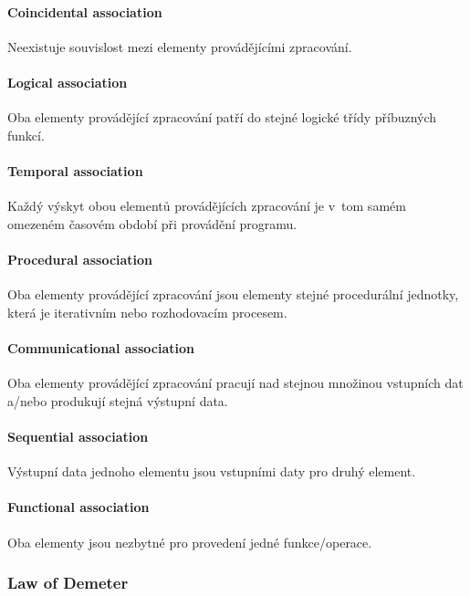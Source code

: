 \paragraph{Coincidental association} Neexistuje souvislost mezi elementy provádějícími zpracování.

\paragraph{Logical association} Oba elementy provádějící zpracování patří do stejné logické třídy příbuzných funkcí.

\paragraph{Temporal association} Každý výskyt obou elementů provádějících zpracování je v~tom samém omezeném časovém období při provádění programu.

\paragraph{Procedural association} Oba elementy provádějící zpracování jsou elementy stejné procedurální jednotky, která je iterativním nebo rozhodovacím procesem.

\paragraph{Communicational association} Oba elementy provádějící zpracování pracují nad stejnou množinou vstupních dat a/nebo produkují stejná výstupní data.

\paragraph{Sequential association} Výstupní data jednoho elementu jsou vstupními daty pro druhý element.

\paragraph{Functional association} Oba elementy jsou nezbytné pro provedení jedné funkce/operace.

\subsubsection{Law of Demeter}


